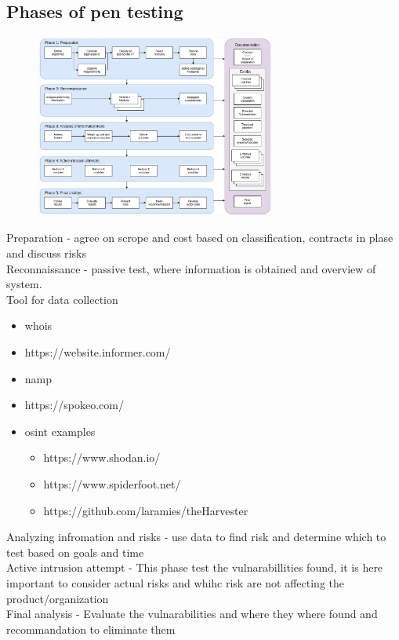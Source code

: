 \documentclass[12pt, a4paper]{article}
\begin{document}
		\subsection{Phases of pen testing}
			\begin{figure}[h!]
				\centering
				\includegraphics[width=300px]{assets/penPhases.png}
			\end{figure}
			Preparation - agree on scrope and cost based on classification, contracts in plase and discuss risks\\
			Reconnaissance - passive test, where information is obtained and overview of system.\\
			Tool for data collection
			\begin{itemize}
				\item whois
				\item https://website.informer.com/
				\item namp 
				\item https://spokeo.com/
				\item osint examples 
				\begin{itemize}
					\item https://www.shodan.io/
					\item https://www.spiderfoot.net/
					\item https://github.com/laramies/theHarvester
				\end{itemize}
			\end{itemize}
			Analyzing infromation and risks - use data to find risk and determine which to test based on goals and time\\
			Active intrusion attempt - This phase test the vulnarabillities found, it is here important to consider actual risks and whihc risk are not affecting the product/organization\\
			Final analysis - Evaluate the vulnarabilities and where they where found and recommandation to eliminate them\\
\end{document}
